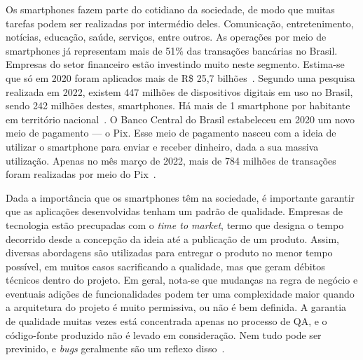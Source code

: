 Os smartphones fazem parte do cotidiano da sociedade, de modo que muitas tarefas podem ser realizadas por intermédio deles.
Comunicação, entretenimento, notícias, educação, saúde, serviços, entre outros.
As operações por meio de smartphones já representam mais de 51\% das transações bancárias no Brasil.
Empresas do setor financeiro estão investindo muito neste segmento.
Estima-se que só em 2020 foram aplicados mais de R\$ 25,7 bilhões~\cite{febraban-data}.
Segundo uma pesquisa realizada em 2022, existem 447 milhões de dispositivos digitais em uso no Brasil, sendo 242 milhões destes, smartphones.
Há mais de 1 smartphone por habitante em território nacional~\cite{it-usage-data}.
O Banco Central do Brasil estabeleceu em 2020 um novo meio de pagamento — o Pix.
Esse meio de pagamento nasceu com a ideia de utilizar o smartphone para enviar e receber dinheiro, dada a sua massiva utilização.
Apenas no mês março de 2022, mais de 784 milhões de transações foram realizadas por meio do Pix~\cite{pix-statistics}.

Dada a importância que os smartphones têm na sociedade, é importante garantir que as aplicações desenvolvidas tenham um padrão de qualidade.
Empresas de tecnologia estão precupadas com o \emph{time to market}, termo que designa o tempo decorrido desde a concepção da ideia até a publicação de um produto.
Assim, diversas abordagens são utilizadas para entregar o produto no menor tempo possível, em muitos casos sacrificando a qualidade, mas que geram débitos técnicos dentro do projeto.
Em geral, nota-se que mudanças na regra de negócio e eventuais adições de funcionalidades podem ter uma complexidade maior quando a arquitetura do projeto é muito permissiva, ou não é bem definida.
A garantia de qualidade muitas vezes está concentrada apenas no processo de QA, e o código-fonte produzido não é levado em consideração.
Nem tudo pode ser previnido, e \emph{bugs} geralmente são um reflexo disso~\cite{quality-standards-paper}.